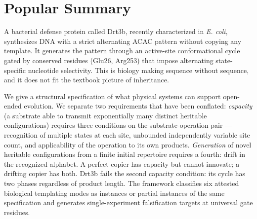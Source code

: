 \documentclass[aps,prx,reprint,amsmath,amssymb,floatfix,superscriptaddress,nofootinbib]{revtex4-2}
\theoremstyle{plain-thm}
\theoremstyle{definition-thm}
\begin{document}
\begin{abstract}
classified as cyclic-conformational templating; the E26Q point mutant matches the framework's derived prediction (marginal G fraction $0.10$, observed $0.1016$); AbiK same-fold non-templating is excluded; Drt3a Mode 1 is separated from Drt3b Mode 3 by 1.0 bits of channel mutual information against the stated five-channel ensemble. Family-level apparatus application across 1{,}232 Drt3b homologs is consistent with in-envelope behavior for 33 secondary-residue clades and predicts a 17-fold elevation in dG misincorporation at the A-state for 6 E26$\to$D primary-gate clades, the framework-derived shift for selectivity-gate degradation. Two distinct universal-gate classes generate single-experiment falsification targets: an architectural gate (R253) whose substitution predicts cycle-architecture collapse, and a selectivity gate (G248) whose substitution predicts intact cycle with shifted product composition.
\end{abstract}

\maketitle

\section*{Popular Summary}

A bacterial defense protein called Drt3b, recently characterized in \emph{E. coli}, synthesizes DNA with a strict alternating ACAC pattern without copying any template. It generates the pattern through an active-site conformational cycle gated by conserved residues (Glu26, Arg253) that impose alternating state-specific nucleotide selectivity. This is biology making sequence without sequence, and it does not fit the textbook picture of inheritance.

We give a structural specification of what physical systems can support open-ended evolution. We separate two requirements that have been conflated: \emph{capacity} (a substrate able to transmit exponentially many distinct heritable configurations) requires three conditions on the substrate-operation pair --- recognition of multiple states at each site, unbounded independently variable site count, and applicability of the operation to its own products. \emph{Generation} of novel heritable configurations from a finite initial repertoire requires a fourth: drift in the recognized alphabet. A perfect copier has capacity but cannot innovate; a drifting copier has both. Drt3b fails the second capacity condition: its cycle has two phases regardless of product length. The framework classifies six attested biological templating modes as instances or partial instances of the same specification and generates single-experiment falsification targets at universal gate residues.
\end{document}
